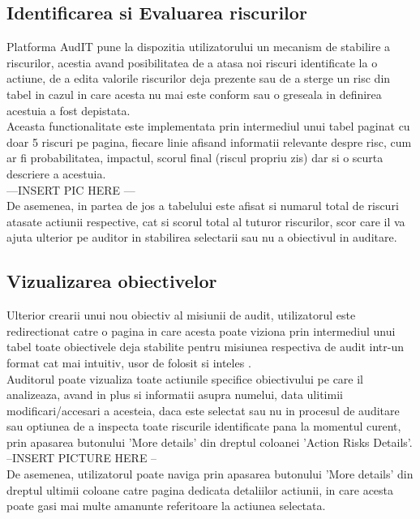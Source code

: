 \subsection{Identificarea si Evaluarea riscurilor}
Platforma AudIT pune la dispozitia utilizatorului un mecanism de stabilire a riscurilor, acestia avand posibilitatea de a atasa noi riscuri identificate la o actiune, de a edita valorile riscurilor deja prezente sau de a sterge un risc din tabel in cazul in care acesta nu mai este conform sau o greseala in definirea acestuia a fost depistata.\\
Aceasta functionalitate este implementata prin intermediul unui tabel paginat cu doar 5 riscuri pe pagina, fiecare linie afisand informatii relevante despre risc, cum ar fi probabilitatea, impactul, scorul final (riscul propriu zis) dar si o scurta descriere a acestuia.\\
---INSERT PIC HERE --- \\
De asemenea, in partea de jos a tabelului este afisat si numarul total de riscuri atasate actiunii respective, cat si scorul total al tuturor riscurilor, scor care il va ajuta ulterior pe auditor in stabilirea selectarii sau nu a obiectivul in auditare.

\subsection{Vizualizarea obiectivelor}

Ulterior crearii unui nou obiectiv al misiunii de audit, utilizatorul este redirectionat catre o pagina in care acesta poate viziona prin intermediul unui tabel toate obiectivele deja stabilite pentru misiunea respectiva de audit intr-un format cat mai intuitiv, usor de folosit si inteles .\\
Auditorul poate vizualiza toate actiunile specifice obiectivului pe care il analizeaza, avand in plus si informatii asupra numelui, data ulitimii modificari/accesari a acesteia, daca este selectat sau nu in procesul de auditare sau optiunea de a inspecta toate riscurile identificate pana la momentul curent, prin apasarea butonului 'More details' din dreptul coloanei 'Action Risks Details'.\\
--INSERT PICTURE HERE --\\
De asemenea, utilizatorul poate naviga prin apasarea butonului 'More details' din dreptul ultimii coloane catre pagina dedicata detaliilor actiunii, in care acesta poate gasi mai multe amanunte referitoare la actiunea selectata.

